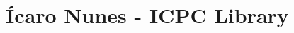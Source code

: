 \documentclass[10pt]{article}
\title{\vspace{-4ex}\Large{Ícaro Nunes - ICPC Library}}
\author{}
\date{}
\begin{document}
\begin{landscape}
\begin{multicols}{2}

\maketitle
\vspace{-13ex}
\tableofcontents
\pagestyle{fancy}



\end{multicols}
\end{landscape}
\end{document}
